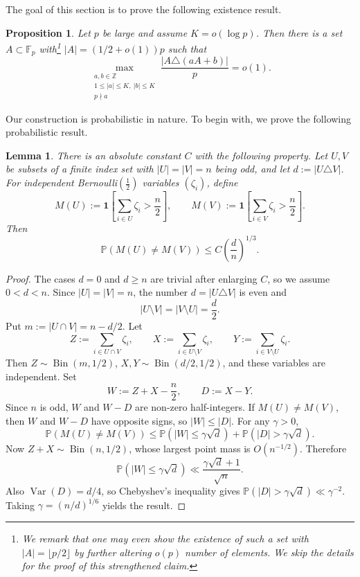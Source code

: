 \documentclass[11pt,letterpaper,reqno]{amsart}
\newtheorem{lemma}[theorem]{Lemma}
\newtheorem{proposition}[theorem]{Proposition}
\theoremstyle{definition}
\newcommand{\F}{\mathbb F}
\newcommand{\Z}{\mathbb Z}
\newcommand{\1}{\mathbf 1}
\DeclareMathOperator{\Bin}{Bin}
\begin{document}
The goal of this section is to prove the following existence result.
\begin{proposition}\label{prop:lower} Let $p$ be large and 
assume $K=o(\log p)$. Then there is a set $A\subset\F_p$ with\footnote{We remark that one may even show the existence of such a set with $|A|=\lfloor p/2\rfloor$ by further altering $o(p)$ number of elements. We skip the details for the proof of this strengthened claim.} $|A|=(1/2+o(1))p$ such that
\[
    \max_{\substack{a,b\in\Z\\ 1\le |a|\le K,
        \ |b|\le K\\ p\nmid a}}
        \frac{|A\triangle(aA+b)|}{p}=o(1).
\]
\end{proposition}
Our construction is probabilistic in nature. To begin with, we prove the following probabilistic result. 

\begin{lemma}\label{lem:majority}
There is an absolute constant $C$ with the following property.  Let $U,V$ be subsets of a finite index set with $|U|=|V|=n$ being odd, and let
$d:=|U\triangle V|$.  For independent Bernoulli$(\frac{1}{2})$ variables $(\zeta_i)$,
define
\[
M(U):=\1\left[\sum_{i\in U}\zeta_i>\frac n2\right],
    \qquad
    M(V):=\1\left[\sum_{i\in V}\zeta_i>\frac n2\right].
\]
Then
\[
        \mathbb P(M(U)\ne M(V))\le C\left(\frac dn\right)^{1/3}.
\]
\end{lemma}

\begin{proof}
The cases $d=0$ and $d \ge n$ are trivial after enlarging $C$, so we assume
$0<d<n$.  Since $|U|=|V|=n$, the number $d=|U\triangle V|$ is even and
\[
        |U\setminus V|=|V\setminus U|=\frac d2 .
\]
Put $m:=|U\cap V|=n-d/2$.  Let
\[
    Z:=\sum_{i\in U\cap V}\zeta_i,
    \qquad
    X:=\sum_{i\in U\setminus V}\zeta_i,
    \qquad
    Y:=\sum_{i\in V\setminus U}\zeta_i.
\]
Then $Z\sim\Bin(m,1/2)$, $X,Y\sim\Bin(d/2,1/2)$, and these variables are
independent.  Set
\[
        W:=Z+X-\frac n2,
        \qquad
        D:=X-Y.
\]
Since $n$ is odd, $W$ and $W-D$ are non-zero half-integers. If $M(U)\ne M(V)$, then $W$ and $W-D$ have opposite signs, so $|W|\le |D|$.
For any $\gamma>0$,
\[
    \mathbb P(M(U)\ne M(V))
    \le \mathbb P(|W|\le \gamma\sqrt d)
      +\mathbb P(|D|>\gamma\sqrt d).
\]
Now $Z+X\sim\Bin(n,1/2)$, whose largest point mass is $O(n^{-1/2})$.  Therefore
\[
    \mathbb P(|W|\le \gamma\sqrt d)
    \ll \frac{\gamma\sqrt d+1}{\sqrt n}.
\]
Also $\operatorname{Var}(D)=d/4$, so Chebyshev's inequality gives
$\mathbb P(|D|>\gamma\sqrt d)\ll \gamma^{-2}$.  Taking
$\gamma=(n/d)^{1/6}$ yields the result.
\end{proof}
\end{document}
